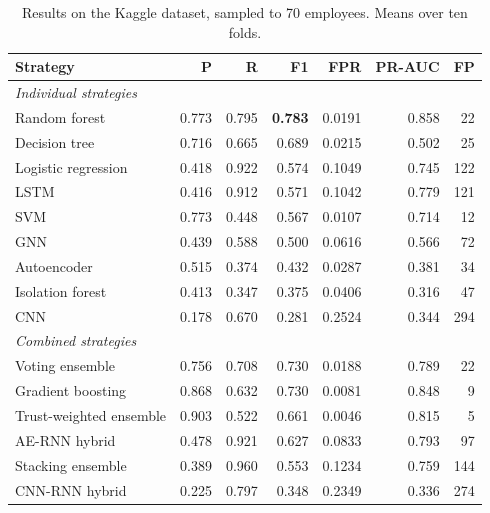 \begin{table}[H]
\centering
\small
\begin{tabular}{lrrrrrr}
\toprule
Strategy & P & R & F1 & FPR & PR-AUC & FP \\
\midrule
\multicolumn{7}{l}{\textit{Individual strategies}} \\
Random forest & 0.773 & 0.795 & \textbf{0.783} & 0.0191 & 0.858 & 22 \\
Decision tree & 0.716 & 0.665 & 0.689 & 0.0215 & 0.502 & 25 \\
Logistic regression & 0.418 & 0.922 & 0.574 & 0.1049 & 0.745 & 122 \\
LSTM & 0.416 & 0.912 & 0.571 & 0.1042 & 0.779 & 121 \\
SVM & 0.773 & 0.448 & 0.567 & 0.0107 & 0.714 & 12 \\
GNN & 0.439 & 0.588 & 0.500 & 0.0616 & 0.566 & 72 \\
Autoencoder & 0.515 & 0.374 & 0.432 & 0.0287 & 0.381 & 34 \\
Isolation forest & 0.413 & 0.347 & 0.375 & 0.0406 & 0.316 & 47 \\
CNN & 0.178 & 0.670 & 0.281 & 0.2524 & 0.344 & 294 \\
\midrule
\multicolumn{7}{l}{\textit{Combined strategies}} \\
Voting ensemble & 0.756 & 0.708 & 0.730 & 0.0188 & 0.789 & 22 \\
Gradient boosting & 0.868 & 0.632 & 0.730 & 0.0081 & 0.848 & 9 \\
Trust-weighted ensemble & 0.903 & 0.522 & 0.661 & 0.0046 & 0.815 & 5 \\
AE-RNN hybrid & 0.478 & 0.921 & 0.627 & 0.0833 & 0.793 & 97 \\
Stacking ensemble & 0.389 & 0.960 & 0.553 & 0.1234 & 0.759 & 144 \\
CNN-RNN hybrid & 0.225 & 0.797 & 0.348 & 0.2349 & 0.336 & 274 \\
\bottomrule
\end{tabular}
\caption{Results on the Kaggle dataset, sampled to 70 employees. Means over ten folds.}
\label{tab:results-kaggle}
\end{table}
